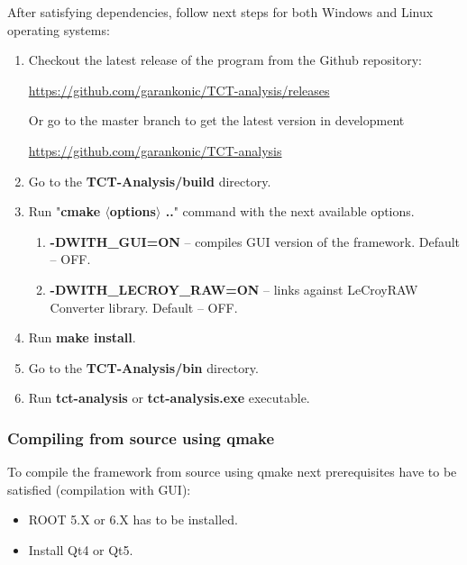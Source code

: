 \documentclass[12pt,oneside,notitlepage,abstracton,a4paper]{scrartcl}
\begin{document}
After satisfying dependencies, follow next steps for both Windows and Linux operating systems:
\begin{enumerate}
\item Checkout the latest release of the program from the Github repository:
\begin{displayquote}
\url{https://github.com/garankonic/TCT-analysis/releases}
\end{displayquote}
Or go to the master branch to get the latest version in development
\begin{displayquote}
\url{https://github.com/garankonic/TCT-analysis}
\end{displayquote}
\item Go to the \textbf{TCT-Analysis/build} directory.
\item Run "\textbf{cmake $\langle$options$\rangle$ ..}" command with the next available options.
\begin{enumerate}
\item \textbf{-DWITH\_GUI=ON} -- compiles GUI version of the framework. Default -- OFF.
\item \textbf{-DWITH\_LECROY\_RAW=ON} -- links against LeCroyRAW Converter library. Default -- OFF.
\end{enumerate}
\item Run \textbf{make install}.
\item Go to the \textbf{TCT-Analysis/bin} directory.
\item Run \textbf{tct-analysis} or \textbf{tct-analysis.exe} executable.
\end{enumerate}

\subsubsection{Compiling from source using qmake}

To compile the framework from source using qmake next prerequisites have to be satisfied (compilation with GUI):
\begin{itemize}
\item ROOT 5.X or 6.X has to be installed.
\item Install Qt4 or Qt5.
\end{itemize}
\end{document}
